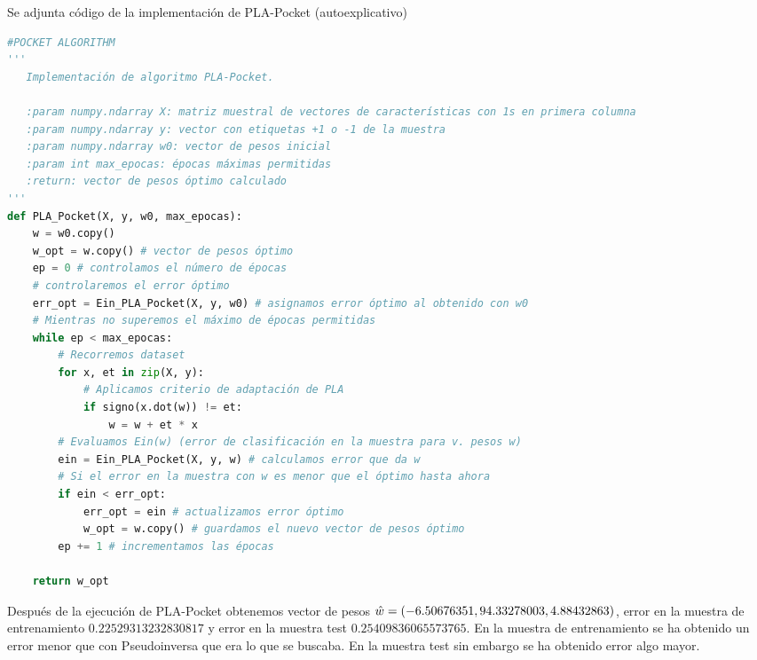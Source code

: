 \documentclass[11pt,a4paper]{article}
\theoremstyle{definition}
\begin{document}
	Se adjunta código de la implementación de PLA-Pocket (autoexplicativo)
	\begin{lstlisting}[language=Python, caption= Implementaci\'on de algoritmo PLA-Pocket en Python, inputencoding=latin1]
  #POCKET ALGORITHM
'''
   Implementación de algoritmo PLA-Pocket. 
   
   :param numpy.ndarray X: matriz muestral de vectores de características con 1s en primera columna
   :param numpy.ndarray y: vector con etiquetas +1 o -1 de la muestra
   :param numpy.ndarray w0: vector de pesos inicial
   :param int max_epocas: épocas máximas permitidas
   :return: vector de pesos óptimo calculado
'''
def PLA_Pocket(X, y, w0, max_epocas):
    w = w0.copy()
    w_opt = w.copy() # vector de pesos óptimo
    ep = 0 # controlamos el número de épocas
    # controlaremos el error óptimo
    err_opt = Ein_PLA_Pocket(X, y, w0) # asignamos error óptimo al obtenido con w0
    # Mientras no superemos el máximo de épocas permitidas
    while ep < max_epocas:
        # Recorremos dataset
        for x, et in zip(X, y):
            # Aplicamos criterio de adaptación de PLA
            if signo(x.dot(w)) != et:
                w = w + et * x
        # Evaluamos Ein(w) (error de clasificación en la muestra para v. pesos w) 
        ein = Ein_PLA_Pocket(X, y, w) # calculamos error que da w
        # Si el error en la muestra con w es menor que el óptimo hasta ahora
        if ein < err_opt:
            err_opt = ein # actualizamos error óptimo
            w_opt = w.copy() # guardamos el nuevo vector de pesos óptimo
        ep += 1 # incrementamos las épocas
        
    return w_opt
	\end{lstlisting}
	
	Después de la ejecución de PLA-Pocket obtenemos vector de pesos $\hat w= (-6.50676351, 94.33278003,\\ 4.88432863)$, error en la muestra de entrenamiento $0.22529313232830817$ y error en la muestra test $0.25409836065573765$. En la muestra de entrenamiento se ha obtenido un error menor que con Pseudoinversa que era lo que se buscaba. En la muestra test sin embargo se ha obtenido error algo mayor.
	
\end{document}

